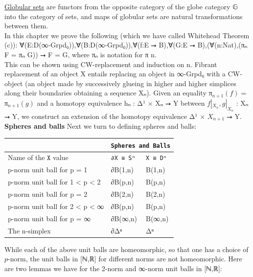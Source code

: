 \documentclass{book}
\theoremstyle{definition}
\begin{document}
\href{https://ncatlab.org/nlab/show/globular+set}{Globular sets} are functors from the opposite category of the globe category 𝔾 into the category of sets, and maps of globular sets are natural transformations between them.\\

In this chapter we prove the following (which we have called Whitehead Theorem (c)): ∀(E:D(∞-Grpd₀)),∀(B:D(∞-Grpd₀)),∀(f:E ⭢ B),∀(G:E ⭢ B),(∀(n:Nat),(πₙ F = πₙ G)) ⭢ F = G, where πₙ is notation for π n.\\

This can be shown using CW-replacement and induction on n. Fibrant replacement of an object X entails replacing an object in ∞-Grpd₀ with a CW-object (an object made by successively glueing in higher and higher simplices along their boundaries obtaining a sequence Xₙ). Given an equality π${}_{n+1}(f) = $π${}_{n+1}(g)$ and a homotopy equivalence hₙ : Δ¹ × Xₙ ⭢ Y between $f|_{X_n}, g|_{X_n}$ : Xₙ ⭢ Y, we construct an extension of the homotopy equivalence Δ¹ × $X_{n+1}$ ⭢ Y.\\

{\bf Spheres and balls} Next we turn to defining spheres and balls:

{
\footnotesize
\begin{center}
\begin{tabular}{||l || l || l ||} 
 \hline
  & \multicolumn{2}{||c||}{\texttt{Spheres and Balls}} \\
 \hline
 Name of the $\texttt{X}$ value & \texttt{∂X ≅ Sⁿ} & \texttt{X ≅ Dⁿ} \\
 \hline
 \hline
 p-norm unit ball for p = 1 & ∂B(1,n) & B(1,n) \\
 \hline
 p-norm unit ball for 1 < p < 2 & ∂B(p,n) & B(p,n) \\
 \hline
 p-norm unit ball for p = 2 & ∂B(2,n) & B(2,n) \\
 \hline
 p-norm unit ball for 2 < p < ∞ & ∂B(p,n) & B(p,n) \\
 \hline
 p-norm unit ball for p = ∞ & ∂B(∞,n) & B(∞,n) \\
 \hline
 The n-simplex & ∂Δⁿ & Δⁿ \\
 \hline
 \hline
\end{tabular}
\end{center}
}

While each of the above unit balls are homeomorphic, so that one has a choice of $p$-norm, the unit balls in [ℕ,ℝ] for different norms are not homeomorphic. Here are two lemmas we have for the 2-norm and ∞-norm unit balls in [ℕ,ℝ]:
\end{document}
